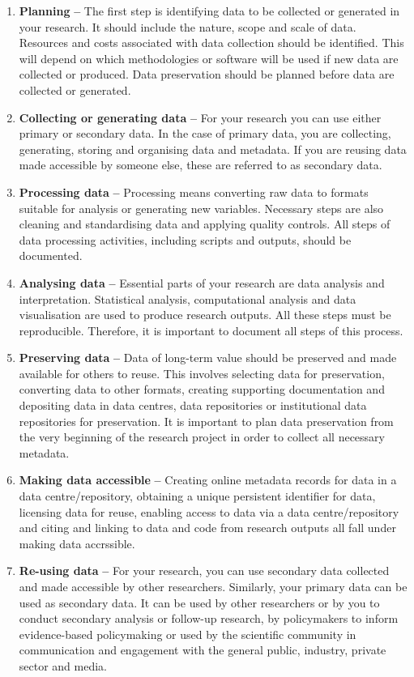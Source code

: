 \documentclass[
]{book}
\begin{document}
\begin{enumerate}
\def\labelenumi{\arabic{enumi}.}
\item
  \textbf{Planning} \textbf{--} The first step is identifying data to be collected or generated in your research. It should include the nature, scope and scale of data. Resources and costs associated with data collection should be identified. This will depend on which methodologies or software will be used if new data are collected or produced. Data preservation should be planned before data are collected or generated.
\item
  \textbf{Collecting or generating data} \textbf{--} For your research you can use either primary or secondary data. In the case of primary data, you are collecting, generating, storing and organising data and metadata. If you are reusing data made accessible by someone else, these are referred to as secondary data.
\item
  \textbf{Processing data} \textbf{--} Processing means converting raw data to formats suitable for analysis or generating new variables. Necessary steps are also cleaning and standardising data and applying quality controls. All steps of data processing activities, including scripts and outputs, should be documented.
\item
  \textbf{Analysing data} \textbf{--} Essential parts of your research are data analysis and interpretation. Statistical analysis, computational analysis and data visualisation are used to produce research outputs. All these steps must be reproducible. Therefore, it is important to document all steps of this process.
\item
  \textbf{Preserving data} \textbf{--} Data of long-term value should be preserved and made available for others to reuse. This involves selecting data for preservation, converting data to other formats, creating supporting documentation and depositing data in data centres, data repositories or institutional data repositories for preservation. It is important to plan data preservation from the very beginning of the research project in order to collect all necessary metadata.
\item
  \textbf{Making data accessible} \textbf{--} Creating online metadata records for data in a data centre/repository, obtaining a unique persistent identifier for data, licensing data for reuse, enabling access to data via a data centre/repository and citing and linking to data and code from research outputs all fall under making data accrssible.
\item
  \textbf{Re-using data} \textbf{--} For your research, you can use secondary data collected and made accessible by other researchers. Similarly, your primary data can be used as secondary data. It can be used by other researchers or by you to conduct secondary analysis or follow-up research, by policymakers to inform evidence-based policymaking or used by the scientific community in communication and engagement with the general public, industry, private sector and media.
\end{enumerate}
\end{document}
